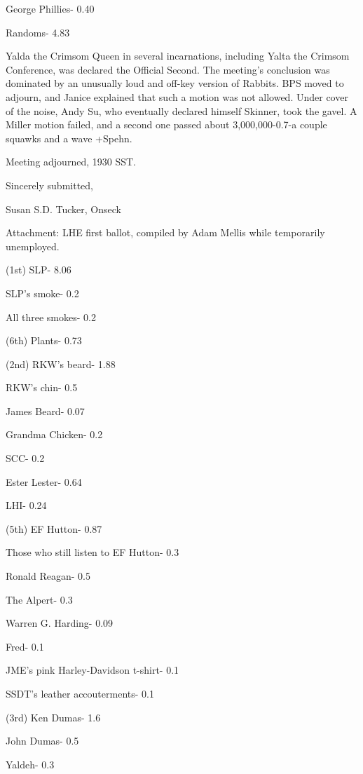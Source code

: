 \documentclass[12pt]{article}
\begin{document}
George Phillies- 0.40

Randoms- 4.83

Yalda the Crimsom Queen in several incarnations, including Yalta the Crimsom Conference, was declared the Official Second. The meeting's conclusion was dominated by an unusually loud and off-key version of Rabbits. BPS moved to adjourn, and Janice explained that such a motion was not allowed. Under cover of the noise, Andy Su, who eventually declared himself Skinner, took the gavel. A Miller motion failed, and a second one passed about 3,000,000-0.7-a couple squawks and a wave +Spehn.

\vspace{12pt}

\noindent
Meeting adjourned, 1930 SST.

\vspace{18pt}

\centerline{Sincerely submitted,}
\centerline{Susan S.D. Tucker, Onseck}

\vspace{18pt}

Attachment: LHE first ballot, compiled by Adam Mellis while temporarily unemployed.

(1st) SLP- 8.06

SLP's smoke- 0.2

All three smokes- 0.2

(6th) Plants- 0.73

(2nd) RKW's beard- 1.88

RKW's chin- 0.5

James Beard- 0.07

Grandma Chicken- 0.2

SCC- 0.2

Ester Lester- 0.64

LHI- 0.24

(5th) EF Hutton- 0.87

Those who still listen to EF Hutton- 0.3

Ronald Reagan- 0.5

The Alpert- 0.3

Warren G. Harding- 0.09

Fred- 0.1

JME's pink Harley-Davidson t-shirt- 0.1

SSDT's leather accouterments- 0.1

(3rd) Ken Dumas- 1.6

John Dumas- 0.5

Yaldeh- 0.3
\end{document}
